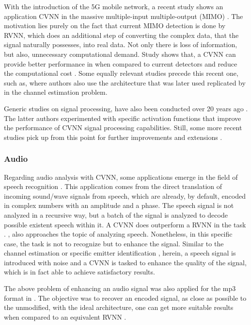 With the introduction of the 5G mobile network, a recent study shows an application \gls{CVNN} in the massive multiple-input multiple-output (MIMO) \parencite{tiba2023signalmimocvnn} . The motivation lies purely on the fact that current MIMO detection is done by \gls{RVNN}, which does an additional step of converting the complex data, that the signal naturally possesses, into real data. Not only there is loss of information, but also, unnecessary computational demand. Study shows that, a \gls{CVNN} can provide better performance in when compared to current detectors and reduce the computational cost \parencite{hirose2012cohersignal, tiba2023signalmimocvnn}. Some equally relevant studies precede this recent one, such as, \parencite{marseet2017firstmimo} where authors also use the architecture that was later used replicated by \parencite{yuan2019channel} in the channel estimation problem.

Generic studies on signal processing, have also been conducted over 20 years ago \parencite{kim2000envelope, kim2002perceptron}. The latter authors experimented with specific activation functions that improve the performance of \gls{CVNN} signal processing capabilities. Still, some more recent studies pick up from this point for further improvements and extensions \parencite{scardapane2018complex}.

\subsubsection{Audio}
Regarding audio analysis with \gls{CVNN}, some applications emerge in the field of speech recognition \parencite{hayakawa2018speech}. This application comes from the direct translation of incoming sound/wave signals from speech, which are already, by default, encoded in complex numbers with an amplitude and a phase. The speech signal is not analyzed in a recursive way, but a batch of the signal is analyzed to decode possible existent speech within it. A \gls{CVNN} does outperform a \gls{RVNN} in the task \parencite{hayakawa2018speech}. \textcite{hu2020dccrn}, also approaches the topic of analyzing speech. Nonetheless, in this specific case, the task is not to recognize but to enhance the signal. Similar to the channel estimation or specific emitter identification \parencite{wang2021emmiteridcvnn}, herein, a speech signal is introduced with noise and a \gls{CVNN} is tasked to enhance the quality of the signal, which is in fact able to achieve satisfactory results.

The above problem of enhancing an audio signal was also applied for the mp3 format in \parencite{al2012mp3enhance}. The objective was to recover an encoded signal, as close as possible to the unmodified, with the ideal architecture, one can get more suitable results when compared to an equivalent \gls{RVNN} \parencite{al2012mp3enhance}.

